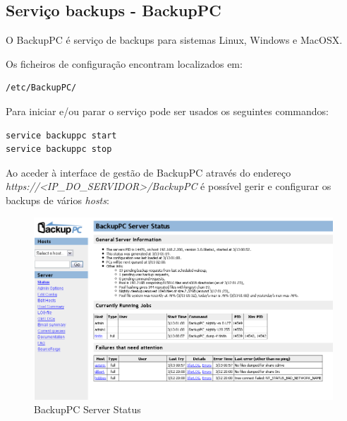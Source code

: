 \subsection{Serviço backups - BackupPC}

O BackupPC é serviço de backups para sistemas Linux, Windows e MacOSX.

Os ficheiros de configuração encontram localizados em:

\begin{Verbatim}[commandchars=\\\{\}]
/etc/BackupPC/
\end{Verbatim}

Para iniciar e/ou parar o serviço pode ser usados os seguintes commandos:

\begin{Verbatim}[commandchars=\\\{\}]
service backuppc start
service backuppc stop
\end{Verbatim}

Ao aceder à interface de gestão de BackupPC através do endereço \emph{https://<IP\_DO\_SERVIDOR>/BackupPC} é possível gerir e configurar os backups de vários \emph{hosts}:

\begin{figure}[H]
    \begin{center}
        \includegraphics[width=13cm]{include/img/backuppc_server_status.png}
    \end{center}
    \caption{BackupPC Server Status}
    \label{fig:backuppc_server_status}
\end{figure}

